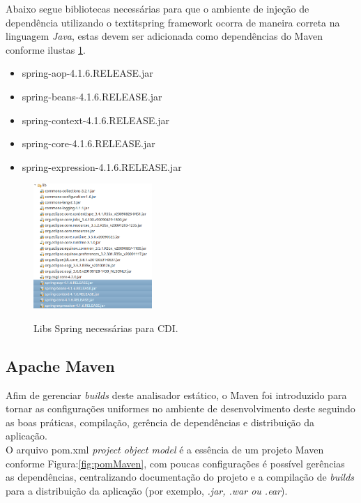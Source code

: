 Abaixo segue bibliotecas necessárias para que o ambiente de injeção de dependência utilizando o textit{spring framework} \cite{SPRING_REF} ocorra de maneira correta na linguagem \textit{Java}, estas devem ser adicionada como dependências do Maven conforme ilustas \ref{fig:libsCDI}.
\begin{itemize}
	\item spring-aop-4.1.6.RELEASE.jar
	\item spring-beans-4.1.6.RELEASE.jar
	\item spring-context-4.1.6.RELEASE.jar
	\item spring-core-4.1.6.RELEASE.jar
	\item spring-expression-4.1.6.RELEASE.jar
\end{itemize}
\clearpage

\begin{figure}[h]
	\center
	\includegraphics[width=0.4\textwidth]{Imagens/libsSpring}
	\label{fig:libsCDI}
	\caption{Libs Spring necessárias para CDI.}
\end{figure}



\clearpage
\subsection{Apache Maven}
Afim de gerenciar \textit{builds} deste analisador estático, o Maven foi introduzido para tornar as configurações uniformes no ambiente de desenvolvimento deste seguindo as boas práticas, compilação, gerência de dependências e distribuição da aplicação.\\

O arquivo pom.xml \textit{project object model} é a essência de um projeto Maven conforme Figura:\ref{fig:pomMaven}, com poucas configurações é possível gerências as dependências, centralizando documentação do projeto e a compilação de \textit{builds} para a distribuição da aplicação (por exemplo, \textit{.jar, .war ou .ear}).\\


